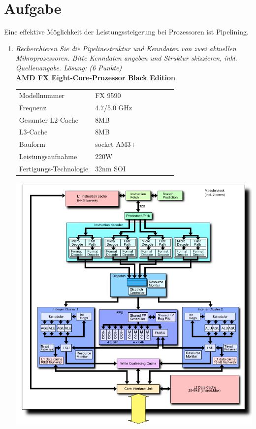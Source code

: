 \documentclass[10pt]{article}
\begin{document}
\newpage

\section{Aufgabe}
Eine effektive Möglichkeit der Leistungssteigerung bei Prozessoren ist Pipelining.
\begin{enumerate}[label=\alph*)]
	\item 
	\textit{Recherchieren Sie die Pipelinestruktur und Kenndaten von zwei aktuellen Mikroprozessoren. Bitte Kenndaten angeben und Struktur skizzieren, inkl. Quellenangabe. Lösung: (6 Punkte) } \\
	\textbf{AMD FX Eight-Core-Prozessor Black Edition}\\
	\begin{tabular}{ l l l l l l l }
		Modellnummer & FX 9590\\
		Frequenz & 4.7/5.0 GHz\\
		Gesamter L2-Cache & 8MB\\
		L3-Cache & 8MB\\
		Bauform & socket AM3+\\
		Leistungsaufnahme & 220W\\
		Fertigungs-Technologie & 32nm SOI\\
	\end{tabular}
	
	\includegraphics[width=1\textwidth]{images/AMD_Bulldozer.png}
	

\end{enumerate}
\end{document}
